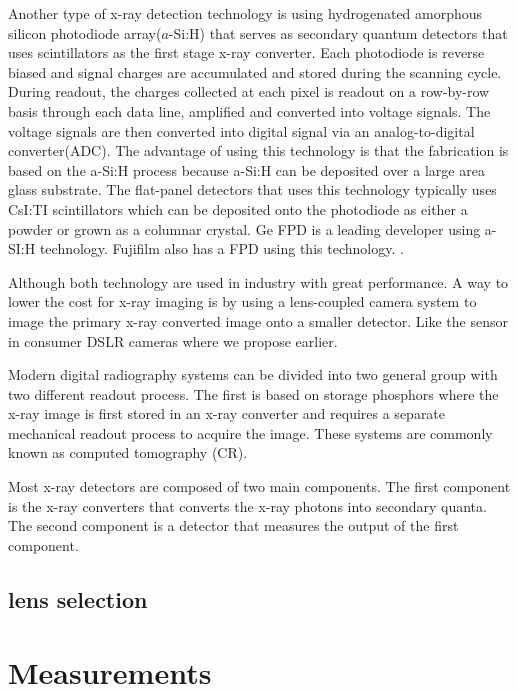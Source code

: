 Another type of x-ray detection technology is using hydrogenated amorphous silicon photodiode array($a$-Si:H) that serves as secondary quantum detectors that uses scintillators as the first stage x-ray converter.  Each photodiode is reverse biased and signal charges are accumulated and stored during the scanning cycle.  During readout, the charges collected at each pixel is readout on a row-by-row basis through each data line, amplified and converted into voltage signals.  The voltage signals are then converted into digital signal via an analog-to-digital converter(ADC).  The advantage of using this technology is that the fabrication is based on the a-Si:H process because a-Si:H can be deposited over a large area glass substrate.  The flat-panel detectors that uses this technology typically uses CsI:TI scintillators which can be deposited onto the photodiode as either a powder or grown as a columnar crystal.  Ge FPD is a leading developer using a-SI:H technology.  Fujifilm also has a FPD using this technology. \cite{Kim2008}.


Although both technology are used in industry with great performance.  A way to lower the cost for x-ray imaging is by using a lens-coupled camera system to image the primary x-ray converted image onto a smaller detector.  Like the sensor in consumer DSLR cameras where we propose earlier.

Modern digital radiography systems can be divided into two general group with two different readout process.  The first is based on storage phosphors where the x-ray image is first stored in an x-ray converter and requires a separate mechanical readout process to acquire the image.  These systems are commonly known as computed tomography (CR).

Most x-ray detectors are composed of two main components.  The first component is the x-ray converters that converts the x-ray photons into secondary quanta.  The second component is a detector that measures the output of the first component.  

\subsection{lens selection}

\section{Measurements}

